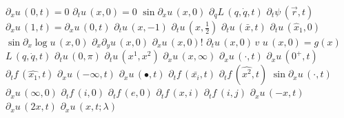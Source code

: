 \documentclass{article}
\begin{document}
$\partial_x u\,(0,t)=0$ $\partial_t u\,(x,0)=0$ $\sin\partial_x u\,(x,0)$ $\partial_q L\,(q,\dot q,t)$ $\partial_t\psi\,(\vec r,t)$
$\partial_x u\,(1,t)=\partial_x u\,(0,t)$ $\partial_t u\,(x,-1)$ $\partial_t u\,(x,\tfrac12)$ $\partial_t u\,(\bar x,t)$ $\partial_t u\,(\hat x_1,0)$
$\sin\partial_x\log u\,(x,0)$ $\partial_x\partial_y u\,(x,0)$ $\partial_x u\,(x,0)!$ $\partial_t u\,(x,0)\,v$ $u\,(x,0)=g(x)$ $L\,(q,\dot q,t)$
$\partial_t u\,(0,\pi)$ $\partial_t u\,(x^1,x^2)$
$\partial_x u\,(x,\infty)$ $\partial_x u\,(\cdot,t)$ $\partial_x u\,(0^+,t)$ $\partial_t f\,(\hat{x_1},t)$ $\partial_x u\,(-\infty,t)$
$\partial_x u\,(\bullet,t)$ $\partial_t f\,(\bar{x_i},t)$ $\partial_t f\,(\hat{x^2},t)$ $\sin\partial_x u\,(\cdot,t)$ $\partial_x u\,(\infty,0)$
$\partial_t f\,(i,0)$ $\partial_t f\,(e,0)$ $\partial_t f\,(x,i)$ $\partial_t f\,(i,j)$
$\partial_x u\,(-x,t)$ $\partial_x u\,(2x,t)$ $\partial_x u\,(x,t;\lambda)$
\end{document}
